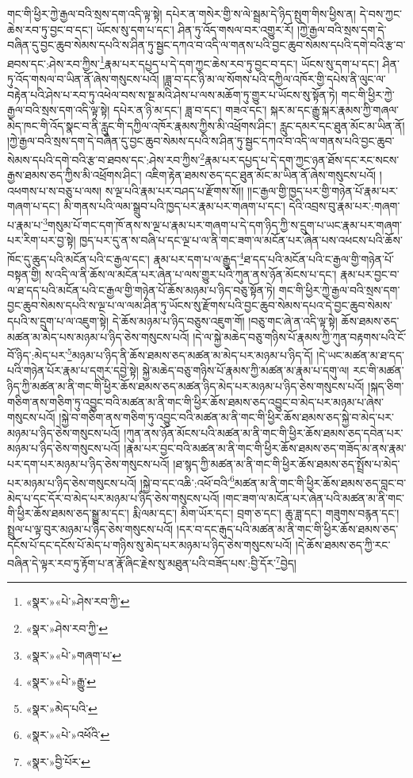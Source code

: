 གང་གི་ཕྱིར་ཀྱེ་རྒྱལ་བའི་སྲས་དག་འདི་ལྟ་སྟེ། དཔེར་ན་གསེར་གྱི་ས་ལེ་སྦྲམ་དེ་ཉིད་སྤུག་གིས་ཕྱིས་ན། དེ་བས་ཀྱང་ཆེས་རབ་ཏུ་བྱང་བ་དང་། ཡོངས་སུ་དག་པ་དང་། ཤིན་ཏུ་འོད་གསལ་བར་འགྱུར་རོ། །ཀྱེ་རྒྱལ་བའི་སྲས་དག་དེ་བཞིན་དུ་བྱང་ཆུབ་སེམས་དཔའི་ས་ཤིན་ཏུ་སྦྱང་དཀའ་བ་འདི་ལ་གནས་པའི་བྱང་ཆུབ་སེམས་དཔའི་དགེ་བའི་རྩ་བ་ཐབས་དང་:ཤེས་རབ་ཀྱིས་\footnote{«སྣར་»«པེ་»ཤེས་རབ་ཀྱི་}རྣམ་པར་དཔྱད་པ་དེ་དག་ཀྱང་ཆེས་རབ་ཏུ་བྱང་བ་དང་། ཡོངས་སུ་དག་པ་དང་། ཤིན་ཏུ་འོད་གསལ་བ་ཡིན་ནོ་ཞེས་གསུངས་པའོ། །ཟླ་བ་དང་ཉི་མ་ལ་སོགས་པའི་དཀྱིལ་འཁོར་གྱི་དཔེས་ནི་ལུང་ལ་བརྟེན་པའི་ཤེས་པ་རབ་ཏུ་འཕེལ་བས་ས་སྔ་མའི་ཤེས་པ་ལས་མཆོག་ཏུ་གྱུར་པ་ཡོངས་སུ་སྟོན་ཏེ། གང་གི་ཕྱིར་ཀྱེ་རྒྱལ་བའི་སྲས་དག་འདི་ལྟ་སྟེ། དཔེར་ན་ཉི་མ་དང་། ཟླ་བ་དང་། གཟའ་དང་། སྐར་མ་དང་རྒྱུ་སྐར་རྣམས་ཀྱི་གཞལ་མེད་ཁང་གི་འོད་སྣང་བ་ནི་རླུང་གི་དཀྱིལ་འཁོར་རྣམས་ཀྱིས་མི་འཕྲོགས་ཤིང་། རླུང་དམར་དང་ཐུན་མོང་མ་ཡིན་ནོ། །ཀྱེ་རྒྱལ་བའི་སྲས་དག་དེ་བཞིན་དུ་བྱང་ཆུབ་སེམས་དཔའི་ས་ཤིན་ཏུ་སྦྱང་དཀའ་བ་འདི་ལ་གནས་པའི་བྱང་ཆུབ་སེམས་དཔའི་དགེ་བའི་རྩ་བ་ཐབས་དང་:ཤེས་རབ་ཀྱིས་\footnote{«སྣར་»ཤེས་རབ་ཀྱི་}རྣམ་པར་དཔྱད་པ་དེ་དག་ཀྱང་ཉན་ཐོས་དང་རང་སངས་རྒྱས་ཐམས་ཅད་ཀྱིས་མི་འཕྲོགས་ཤིང་། འཇིག་རྟེན་ཐམས་ཅད་དང་ཐུན་མོང་མ་ཡིན་ནོ་ཞེས་གསུངས་པའོ། །འཕགས་པ་ས་བཅུ་པ་ལས། ས་ལྔ་པའི་རྣམ་པར་བཤད་པ་རྫོགས་སོ།། །།ང་རྒྱལ་གྱི་ཁྱད་པར་གྱི་གཉེན་པོ་རྣམ་པར་གཞག་པ་དང་། མི་གནས་པའི་ལམ་སྒྲུབ་པའི་ཁྱད་པར་རྣམ་པར་གཞག་པ་དང་། དེའི་འབྲས་བུ་རྣམ་པར་:གཞག་པ་རྣམ་པ་\footnote{«སྣར་»«པེ་»གཞག་པ་}གསུམ་པོ་གང་དག་ཁོ་ནས་ས་ལྔ་པ་རྣམ་པར་གཞག་པ་དེ་དག་ཉིད་ཀྱི་ས་དྲུག་པ་ཡང་རྣམ་པར་གཞག་པར་རིག་པར་བྱ་སྟེ། ཁྱད་པར་དུ་ན་ས་བཞི་པ་དང་ལྔ་པ་ལ་ནི་གང་ཟག་ལ་མངོན་པར་ཞེན་པས་འཕངས་པའི་ཆོས་ཁོང་དུ་ཆུད་པའི་མངོན་པའི་ང་རྒྱལ་དང་། རྣམ་པར་དག་པ་ལ་རྒྱུད་\footnote{«སྣར་»«པེ་»རྒྱུ་}ཐ་དད་པའི་མངོན་པའི་ང་རྒྱལ་གྱི་གཉེན་པོ་བསྟན་གྱི། ས་འདི་ལ་ནི་ཆོས་ལ་མངོན་པར་ཞེན་པ་ལས་གྱུར་པའི་ཀུན་ནས་ཉོན་མོངས་པ་དང་། རྣམ་པར་བྱང་བ་ལ་ཐ་དད་པའི་མངོན་པའི་ང་རྒྱལ་གྱི་གཉེན་པོ་ཆོས་མཉམ་པ་ཉིད་བཅུ་སྟོན་ཏེ། གང་གི་ཕྱིར་ཀྱེ་རྒྱལ་བའི་སྲས་དག་བྱང་ཆུབ་སེམས་དཔའི་ས་ལྔ་པ་ལ་ལམ་ཤིན་ཏུ་ཡོངས་སུ་རྫོགས་པའི་བྱང་ཆུབ་སེམས་དཔའ་དེ་བྱང་ཆུབ་སེམས་དཔའི་ས་དྲུག་པ་ལ་འཇུག་སྟེ། དེ་ཆོས་མཉམ་པ་ཉིད་བཅུས་འཇུག་གོ། །བཅུ་གང་ཞེ་ན་འདི་ལྟ་སྟེ། ཆོས་ཐམས་ཅད་མཚན་མ་མེད་པས་མཉམ་པ་ཉིད་ཅེས་གསུངས་པའོ། །དེ་ལ་སྐྱེ་མཆེད་བཅུ་གཉིས་པོ་རྣམས་ཀྱི་ཀུན་བརྟགས་པའི་ངོ་བོ་ཉིད་:མེད་པར་\footnote{«སྣར་»མེད་པའི་}མཉམ་པ་ཉིད་ནི་ཆོས་ཐམས་ཅད་མཚན་མ་མེད་པར་མཉམ་པ་ཉིད་དོ། །དེ་ཡང་མཚན་མ་ཐ་དད་པའི་གཉེན་པོར་རྣམ་པ་དགུར་དབྱེ་སྟེ། སྐྱེ་མཆེད་བཅུ་གཉིས་པོ་རྣམས་ཀྱི་མཚན་མ་རྣམ་པ་དགུ་ལ། རང་གི་མཚན་ཉིད་ཀྱི་མཚན་མ་ནི་གང་གི་ཕྱིར་ཆོས་ཐམས་ཅད་མཚན་ཉིད་མེད་པར་མཉམ་པ་ཉིད་ཅེས་གསུངས་པའོ། །སྐད་ཅིག་གཅིག་ནས་གཅིག་ཏུ་འབྱུང་བའི་མཚན་མ་ནི་གང་གི་ཕྱིར་ཆོས་ཐམས་ཅད་འབྱུང་བ་མེད་པར་མཉམ་པ་ཞེས་གསུངས་པའོ། །སྐྱེ་བ་གཅིག་ནས་གཅིག་ཏུ་འབྱུང་བའི་མཚན་མ་ནི་གང་གི་ཕྱིར་ཆོས་ཐམས་ཅད་སྐྱེ་བ་མེད་པར་མཉམ་པ་ཉིད་ཅེས་གསུངས་པའོ། །ཀུན་ནས་ཉོན་མོངས་པའི་མཚན་མ་ནི་གང་གི་ཕྱིར་ཆོས་ཐམས་ཅད་དབེན་པར་མཉམ་པ་ཉིད་ཅེས་གསུངས་པའོ། །རྣམ་པར་བྱང་བའི་མཚན་མ་ནི་གང་གི་ཕྱིར་ཆོས་ཐམས་ཅད་གཟོད་མ་ནས་རྣམ་པར་དག་པར་མཉམ་པ་ཉིད་ཅེས་གསུངས་པའོ། །ཐ་སྙད་ཀྱི་མཚན་མ་ནི་གང་གི་ཕྱིར་ཆོས་ཐམས་ཅད་སྤྲོས་པ་མེད་པར་མཉམ་པ་ཉིད་ཅེས་གསུངས་པའོ། །སྐྱེ་བ་དང་འཆི་:འཕོ་བའི་\footnote{«སྣར་»«པེ་»འཕོའི་}མཚན་མ་ནི་གང་གི་ཕྱིར་ཆོས་ཐམས་ཅད་བླང་བ་མེད་པ་དང་དོར་བ་མེད་པར་མཉམ་པ་ཉིད་ཅེས་གསུངས་པའོ། །གང་ཟག་ལ་མངོན་པར་ཞེན་པའི་མཚན་མ་ནི་གང་གི་ཕྱིར་ཆོས་ཐམས་ཅད་སྒྱུ་མ་དང་། རྨི་ལམ་དང་། མིག་ཡོར་དང་། བྲག་ཅ་དང་། ཆུ་ཟླ་དང་། གཟུགས་བརྙན་དང་། སྤྲུལ་པ་ལྟ་བུར་མཉམ་པ་ཉིད་ཅེས་གསུངས་པའོ། །དར་བ་དང་རྒུད་པའི་མཚན་མ་ནི་གང་གི་ཕྱིར་ཆོས་ཐམས་ཅད་དངོས་པོ་དང་དངོས་པོ་མེད་པ་གཉིས་སུ་མེད་པར་མཉམ་པ་ཉིད་ཅེས་གསུངས་པའོ། །དེ་ཆོས་ཐམས་ཅད་ཀྱི་རང་བཞིན་དེ་ལྟར་རབ་ཏུ་རྟོག་པ་ན་རྣོ་ཞིང་རྗེས་སུ་མཐུན་པའི་བཟོད་པས་:བྱི་དོར་\footnote{«སྣར་»བྱི་པོར་}བྱེད། 